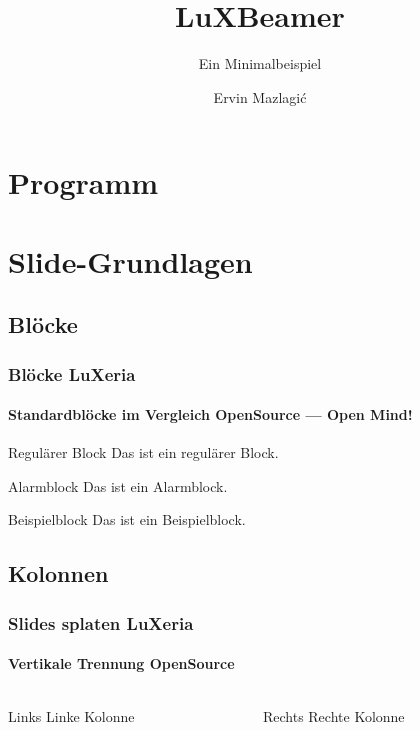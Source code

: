 \documentclass{beamer}
\title{LuXBeamer}
\subtitle{Ein Minimalbeispiel}
\author{Ervin Mazlagi\'c}
\begin{document}
\maketitle


\section{Programm}
\begin{frame}
\tableofcontents
\end{frame}

\section{Slide-Grundlagen}

\subsection{Blöcke}

\begin{frame}
	\frametitle{Blöcke \hfill \footnotesize{LuXeria}}
	\framesubtitle{Standardblöcke im Vergleich \hfill \tiny{OpenSource --- Open Mind!}}
	
	\begin{block}{Regulärer Block}
		Das ist ein regulärer Block.
	\end{block}

	\begin{alertblock}{Alarmblock}
		Das ist ein Alarmblock.
	\end{alertblock}

	\begin{exampleblock}{Beispielblock}
		Das ist ein Beispielblock.
	\end{exampleblock}
\end{frame}

\subsection{Kolonnen}

\begin{frame}
	\frametitle{Slides splaten \hfill \footnotesize{LuXeria}}
	\framesubtitle{Vertikale Trennung \hfill \tiny{OpenSource}}

	\begin{columns}
		\begin{column}{5cm}
			\begin{block}{Links}
				Linke Kolonne
			\end{block}
		\end{column}
		\begin{column}{5cm}
			\begin{block}{Rechts}
				Rechte Kolonne
			\end{block}
		\end{column}
	\end{columns}
\end{frame}
\end{document}
